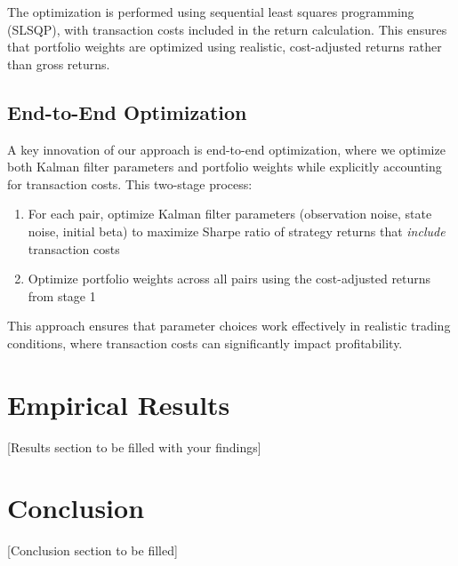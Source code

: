 \documentclass[12pt]{article}
\begin{document}
The optimization is performed using sequential least squares programming (SLSQP), with transaction costs included in the return calculation. This ensures that portfolio weights are optimized using realistic, cost-adjusted returns rather than gross returns.

\subsection{End-to-End Optimization}

A key innovation of our approach is end-to-end optimization, where we optimize both Kalman filter parameters and portfolio weights while explicitly accounting for transaction costs. This two-stage process:

\begin{enumerate}
    \item For each pair, optimize Kalman filter parameters (observation noise, state noise, initial beta) to maximize Sharpe ratio of strategy returns that \textit{include} transaction costs
    \item Optimize portfolio weights across all pairs using the cost-adjusted returns from stage 1
\end{enumerate}

This approach ensures that parameter choices work effectively in realistic trading conditions, where transaction costs can significantly impact profitability.

\section{Empirical Results}

[Results section to be filled with your findings]

\section{Conclusion}

[Conclusion section to be filled]



\end{document}

